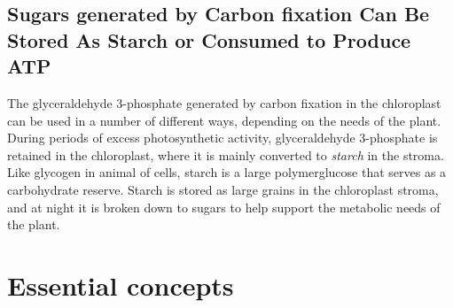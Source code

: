 \subsection{Sugars generated by Carbon fixation Can Be Stored As Starch or Consumed to Produce ATP}

The glyceraldehyde 3-phosphate generated by carbon fixation in the chloroplast
can be used in a number of different ways, depending on the needs
of the plant. During periods of excess photosynthetic activity, glyceraldehyde
3-phosphate is retained in the chloroplast, where it is mainly
converted to \textit{starch} in the stroma. Like glycogen in animal of
cells, starch is a large polymerglucose that serves as a carbohydrate
reserve. Starch is stored as large grains in the chloroplast stroma,
and at night it is broken down to sugars to help support
the metabolic needs of the plant.

\section{Essential concepts}

